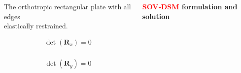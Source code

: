 \documentclass{beamer}
\begin{document}
\begin{frame}
\begin{columns}[T]
\begin{column}{0.31\textwidth}
{{\begin{minipage}{1.2\linewidth}
					\begin{minipage}{0.66\linewidth}
						\centering
						\centering
						\resizebox{0.8\textwidth}{!}{}
						
						\small The orthotropic rectangular plate with all edges\\\hspace*{-4cm} elastically restrained.
					\end{minipage}
					\hfill
					\begin{minipage}{0.30\linewidth}
						\centering
						\begin{align*}
							\det(\mathbf{R}_x) = 0
						\end{align*}\\
						\begin{align*}
							\det(\mathbf{R}_y) = 0
						\end{align*}
					\end{minipage}%
				\end{minipage}
			}%
		} %
	\end{column}
		
		\begin{column}{0.31\textwidth}
			
			{\Large\textbf{\textcolor{red}{SOV‑DSM} formulation and solution}}\par\vspace{0.4em}
			
\end{column}
\end{columns}
\end{frame}
\end{document}
